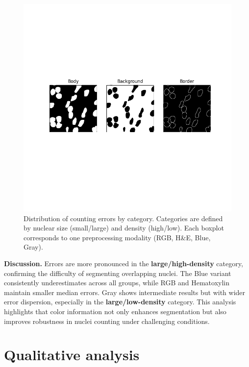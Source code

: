 \documentclass[target=bach,aauheader=,style=]{thud}
\begin{document}
\begin{figure}[h]
    \centering
    \includegraphics[width=\textwidth]{imgs/3ch_binarymask.png}
    \caption{Distribution of counting errors by category. Categories are defined by nuclear size (small/large) and density (high/low). Each boxplot corresponds to one preprocessing modality (RGB, H\&E, Blue, Gray).}
    \label{fig:boxplot_categories}
\end{figure}

\noindent\textbf{Discussion.} 
Errors are more pronounced in the \textbf{large/high-density} category, confirming the difficulty of segmenting overlapping nuclei. 
The Blue variant consistently underestimates across all groups, while RGB and Hematoxylin maintain smaller median errors. 
Gray shows intermediate results but with wider error dispersion, especially in the \textbf{large/low-density} category. 
This analysis highlights that color information not only enhances segmentation but also improves robustness in nuclei counting under challenging conditions.
\section{Qualitative analysis}
\appendix

\end{document}
